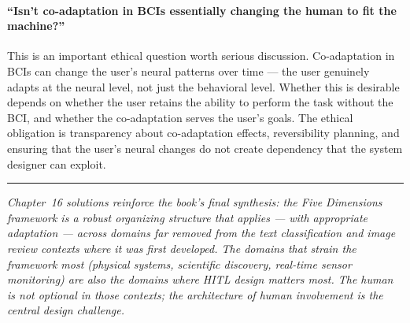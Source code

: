 \paragraph{``Isn't co-adaptation in BCIs essentially changing the human to fit the machine?''}
This is an important ethical question worth serious discussion. Co-adaptation in BCIs can change the user's neural patterns over time --- the user genuinely adapts at the neural level, not just the behavioral level. Whether this is desirable depends on whether the user retains the ability to perform the task without the BCI, and whether the co-adaptation serves the user's goals. The ethical obligation is transparency about co-adaptation effects, reversibility planning, and ensuring that the user's neural changes do not create dependency that the system designer can exploit.

\bigskip
\begin{center}
\rule{0.5\textwidth}{0.4pt}
\end{center}
\bigskip

\noindent\textit{Chapter~16 solutions reinforce the book's final synthesis: the Five Dimensions framework is a robust organizing structure that applies --- with appropriate adaptation --- across domains far removed from the text classification and image review contexts where it was first developed. The domains that strain the framework most (physical systems, scientific discovery, real-time sensor monitoring) are also the domains where HITL design matters most. The human is not optional in those contexts; the architecture of human involvement is the central design challenge.}

